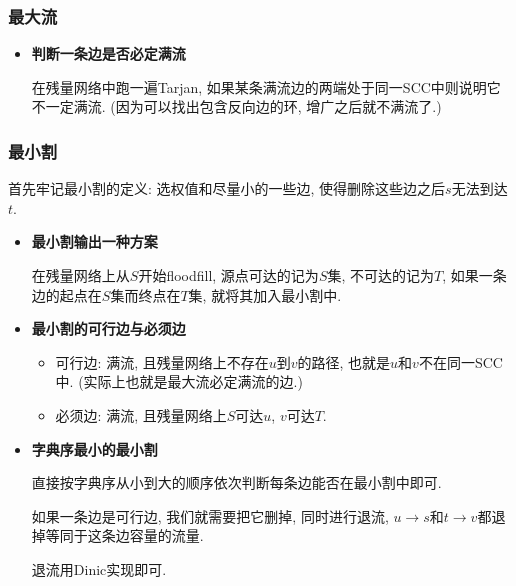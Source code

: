 \subsubsection{最大流}

\begin{itemize}

\item \textbf{判断一条边是否必定满流}

在残量网络中跑一遍Tarjan, 如果某条满流边的两端处于同一SCC中则说明它不一定满流. (因为可以找出包含反向边的环, 增广之后就不满流了.)

\end{itemize}

\subsubsection{最小割}

首先牢记最小割的定义: 选权值和尽量小的一些边, 使得删除这些边之后$s$无法到达$t$.

\begin{itemize}

\item \textbf{最小割输出一种方案}

在残量网络上从$S$开始floodfill, 源点可达的记为$S$集, 不可达的记为$T$, 如果一条边的起点在$S$集而终点在$T$集, 就将其加入最小割中.

\item \textbf{最小割的可行边与必须边}

\begin{itemize}
	\item 可行边: 满流, 且残量网络上不存在$u$到$v$的路径, 也就是$u$和$v$不在同一SCC中. (实际上也就是最大流必定满流的边.)

	\item 必须边: 满流, 且残量网络上$S$可达$u$, $v$可达$T$.
\end{itemize}

\item \textbf{字典序最小的最小割}

直接按字典序从小到大的顺序依次判断每条边能否在最小割中即可.

如果一条边是可行边, 我们就需要把它删掉, 同时进行退流, $u\to s$和$t\to v$都退掉等同于这条边容量的流量.

退流用Dinic实现即可.

\end{itemize}



